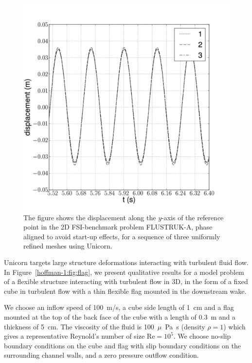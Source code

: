 \begin{figure}
  \centering
  \includegraphics[width=\largefig]{chapters/hoffman-1/png/fsi_bench3D_displacement_aligned.pdf}
  \caption{The figure shows the displacement along the $y$-axis of the
    reference point in the 2D FSI-benchmark problem FLUSTRUK-A, phase
    aligned to avoid start-up effects, for a sequence of three
    uniformly refined meshes using \hbox{Unicorn}.}
  \label{hoffman-1:fig:flustruk}
\end{figure}

Unicorn targets large structure deformations\vadjust{\pagebreak} interacting with turbulent
fluid flow. In Figure~\ref{hoffman-1:fig:flag}, we present qualitative results for
a model problem of a flexible structure interacting with turbulent flow
in 3D, in the form of a fixed cube in turbulent flow with a thin flexible
flag mounted in the downstream wake.

We choose an inflow speed of 100~m/s, a cube side length of 1~cm and a
flag mounted at the top of the back face of the cube with a length of
0.3~m and a thickness of 5~cm. The viscosity of the fluid is
100~$\mu$~Pa~s (density $\rho=1$) which gives a representative
Reynold's number of size $\mathrm{Re} = 10^5$. We choose no-slip
boundary conditions on the cube and flag with slip boundary conditions
on the surrounding channel walls, and a zero pressure outflow
condition.

